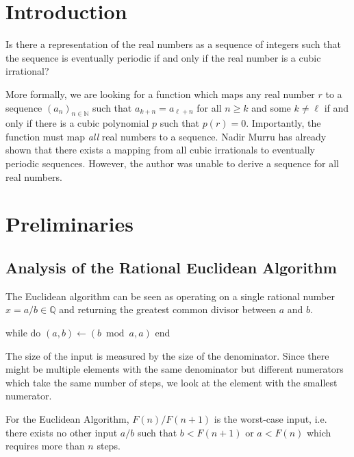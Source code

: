 \documentclass[english,version-2020-11]{uzl-thesis}
\newcommand\N{{\mathbb N}}
\newcommand\Q{{\mathbb Q}}
\begin{document}
\chapter{Introduction}

\begin{problem}
  Is there a representation of the real numbers as a sequence of integers such
  that the sequence is eventually periodic if and only if the real number is a
  cubic irrational?
\end{problem}

More formally, we are looking for a function which maps any real number $r$ to
a sequence $(a_n)_{n \in \N}$ such that $a_{k+n} = a_{\ell+n}$ for all $n \ge k$ and
some $k \ne \ell$ if and only if there is a cubic polynomial $p$ such that $p(r) = 0$.
Importantly, the function must map \emph{all} real numbers to a sequence.
Nadir Murru \cite{Murru15} has already shown that there exists a mapping from all
cubic irrationals to eventually periodic sequences.
However, the author was unable to derive a sequence for all real numbers.

\chapter{Preliminaries}

\section{Analysis of the Rational Euclidean Algorithm}

The Euclidean algorithm can be seen as operating on a single rational number $x
= a/b \in \Q$ and returning the greatest common divisor between $a$ and $b$.

\begin{Pseudocode}
while  do
  $(a, b) \gets (b \bmod a, a)$
end
\end{Pseudocode}

The size of the input is measured by the size of the denominator.
Since there might be multiple elements with the same denominator but different
numerators which take the same number of steps, we look at the element
with the smallest numerator.

\begin{lemma}
  For the Euclidean Algorithm, $F(n) / F(n+1)$ is the worst-case input,
  i.e. there exists no other input $a / b$ such that $b < F(n + 1)$ or
  $a < F(n)$ which requires more than $n$ steps.
\end{lemma}
\end{document}
